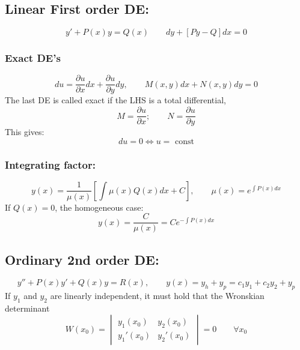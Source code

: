 \documentclass[a4paper,norsk, 10pt]{article}
\begin{document}
\subsection{Linear First order DE:}
\begin{equation}
y' + P(x)y = Q(x)\qquad dy + [Py - Q]dx = 0
\end{equation}
\subsubsection{Exact DE's}
\begin{equation}
du = \frac{\partial u}{\partial x} dx + \frac{\partial u}{\partial y}dy, \qquad M(x,y)dx + N(x,y)dy = 0
\end{equation}
The last DE is called exact if the LHS is a total differential,
\begin{equation}
M = \frac{\partial u}{\partial x}; \qquad N = \frac{\partial u}{\partial y}
\end{equation}
This gives:
\begin{equation}
du = 0 \Leftrightarrow u = \text{ const}
\end{equation}
\subsubsection{Integrating factor:}
\begin{equation}
y(x) = \frac{1}{\mu(x)}\left[\int \mu(x)Q(x)dx + C\right], \qquad \mu(x) = e^{\int P(x)dx}
\end{equation}
If $Q(x) = 0$, the homogeneous case:
\begin{equation}
y(x) = \frac{C}{\mu(x)}=Ce^{-\int P(x)dx}
\end{equation}

\subsection{Ordinary 2nd order DE:}
\begin{equation}
y'' + P(x)y' + Q(x)y = R(x), \qquad y(x) = y_h + y_p = c_1y_1 + c_2y_2 + y_p
\end{equation}
If $y_1$ and $y_2$ are linearly independent, it must hold that the Wronskian determinant
\begin{equation}
W(x_0) = 
\begin{vmatrix}
y_1(x_0) & y_2(x_0)\\
y_1'(x_0) & y_2'(x_0)
\end{vmatrix}
= 0 \qquad \forall x_0
\end{equation}
\end{document}
